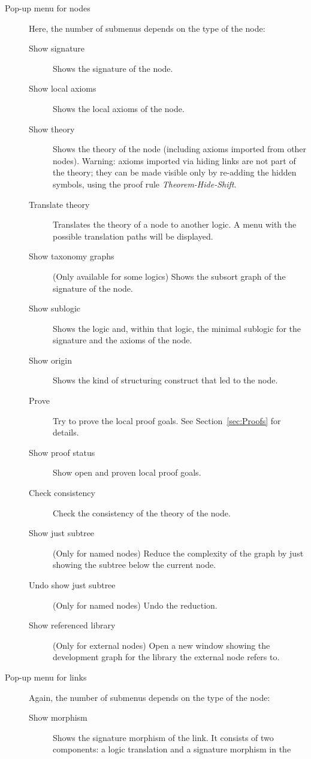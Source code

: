 \documentclass{article}
\begin{document}
\begin{description}
\begin{description}
\end{description}
\item[Pop-up menu for nodes]
Here, the number of submenus depends on the type of the node:
\begin{description}
\item[Show signature] Shows the signature of the node.
\item[Show local axioms] Shows the local axioms of the node.
\item[Show theory] Shows the theory of the node (including axioms
imported from other nodes). Warning: axioms imported via hiding  links
are not part of the theory; they can be made visible only by re-adding
the hidden symbols, using the proof rule \emph{Theorem-Hide-Shift}.
\item[Translate theory] Translates the theory of a node to another logic.
A menu with the possible translation paths will be displayed.
\item[Show taxonomy graphs] (Only available for some logics) Shows the subsort graph of the signature of the node.
\item[Show sublogic] Shows the logic and, within that logic, the minimal sublogic
for the signature and the axioms of the node.
\item[Show origin] Shows the kind of \CASL structuring construct that
led to the node.
\item[Prove] Try to prove the local proof goals. See Section~\ref{sec:Proofs} 
for details.
\item[Show proof status] Show open and proven local proof goals.
\item[Check consistency] Check the consistency of the theory of the node.
\item[Show just subtree] (Only for named nodes) Reduce the complexity
of the graph by just showing the subtree below the current node.
\item[Undo show just subtree] (Only for named nodes) Undo the reduction.
\item[Show referenced library] (Only for external nodes) Open a new window
showing the development graph for the library the external node refers to.
\end{description}
\item[Pop-up menu for links]
Again, the number of submenus depends on the type of the node:
\begin{description}
\item[Show morphism] Shows the signature morphism of the link. It consists
of two components: a logic translation and a signature morphism in the

\end{description}
\end{description}
\end{document}
